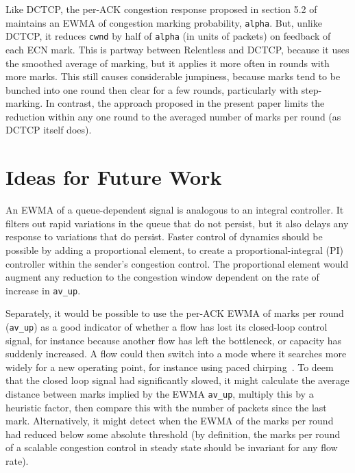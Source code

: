 Like DCTCP, the per-ACK congestion response proposed in section 5.2 of
\cite{Alizadeh11:DCTCP_Analysis} maintains an EWMA of congestion marking
probability, \texttt{alpha}. But, unlike DCTCP, it reduces \texttt{cwnd} by half
of \texttt{alpha} (in units of packets) on feedback of each ECN mark. This is
partway between Relentless and DCTCP, because it uses the smoothed average of
marking, but it applies it more often in rounds with more marks. This still
causes considerable jumpiness, because marks tend to be bunched into one round
then clear for a few rounds, particularly with step-marking. In contrast, the
approach proposed in the present paper limits the reduction within any one round
to the averaged number of marks per round (as DCTCP itself does). %

\section{Ideas for Future Work}\label{prresp_future}

An EWMA of a queue-dependent signal is analogous to an integral controller. It
filters out rapid variations in the queue that do not persist, but it also
delays any response to variations that do persist. Faster control of dynamics
should be possible by adding a proportional element, to create a
proportional-integral (PI) controller within the sender's congestion control.
The proportional element would augment any reduction to the congestion window
dependent on the rate of increase in \texttt{av\_up}.

Separately, it would be possible to use the per-ACK EWMA of marks per round
(\texttt{av\_up}) as a good indicator of whether a flow has lost its closed-loop
control signal, for instance because another flow has left the bottleneck, or
capacity has suddenly increased. A flow could then switch into a mode where it
searches more widely for a new operating point, for instance using paced
chirping~\cite[\S\,3]{Misund19a:Paced_Chirping_Linux}. To deem that the closed
loop signal had significantly slowed, it might calculate the average distance
between marks implied by the EWMA \texttt{av\_up}, multiply this by a heuristic
factor, then compare this with the number of packets since the last mark.
Alternatively, it might detect when the EWMA of the marks per round had reduced
below some absolute threshold (by definition, the marks per round of a scalable
congestion control in steady state should be invariant for any flow rate).
